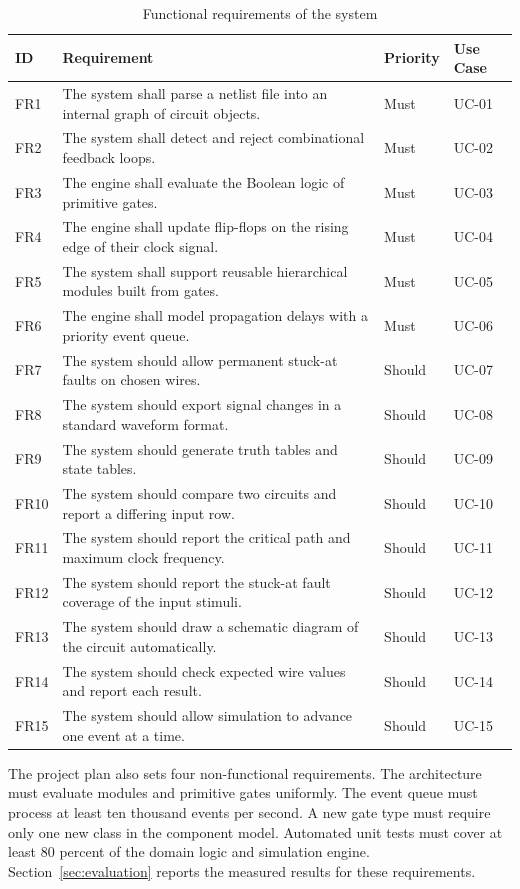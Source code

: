 \begin{table}[tbp]
\centering
\small
\caption{Functional requirements of the system}
\label{tab:requirements}
\begin{tabular}{l>{\raggedright\arraybackslash}p{8.8cm}ll}
\toprule
\textbf{ID} & \textbf{Requirement} & \textbf{Priority} & \textbf{Use Case} \\
\midrule
FR1 & The system shall parse a netlist file into an internal graph of circuit objects. & Must & UC-01 \\
FR2 & The system shall detect and reject combinational feedback loops. & Must & UC-02 \\
FR3 & The engine shall evaluate the Boolean logic of primitive gates. & Must & UC-03 \\
FR4 & The engine shall update flip-flops on the rising edge of their clock signal. & Must & UC-04 \\
FR5 & The system shall support reusable hierarchical modules built from gates. & Must & UC-05 \\
FR6 & The engine shall model propagation delays with a priority event queue. & Must & UC-06 \\
FR7 & The system should allow permanent stuck-at faults on chosen wires. & Should & UC-07 \\
FR8 & The system should export signal changes in a standard waveform format. & Should & UC-08 \\
FR9 & The system should generate truth tables and state tables. & Should & UC-09 \\
FR10 & The system should compare two circuits and report a differing input row. & Should & UC-10 \\
FR11 & The system should report the critical path and maximum clock frequency. & Should & UC-11 \\
FR12 & The system should report the stuck-at fault coverage of the input stimuli. & Should & UC-12 \\
FR13 & The system should draw a schematic diagram of the circuit automatically. & Should & UC-13 \\
FR14 & The system should check expected wire values and report each result. & Should & UC-14 \\
FR15 & The system should allow simulation to advance one event at a time. & Should & UC-15 \\
\bottomrule
\end{tabular}
\end{table}

The project plan also sets four non-functional requirements.
The architecture must evaluate modules and primitive gates uniformly.
The event queue must process at least ten thousand events per second.
A new gate type must require only one new class in the component model.
Automated unit tests must cover at least 80 percent of the domain logic and simulation engine.
Section~\ref{sec:evaluation} reports the measured results for these requirements.

